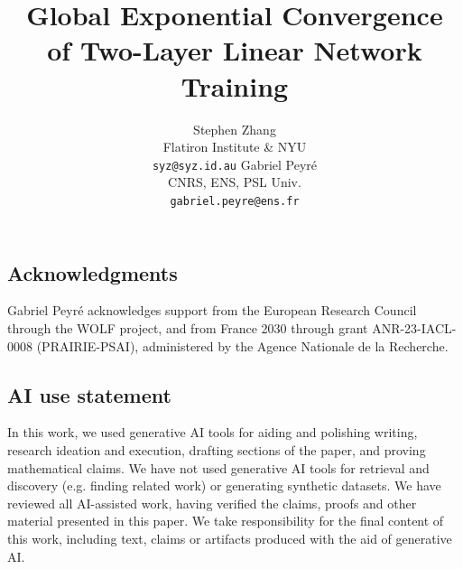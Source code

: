\documentclass{article} %
\title{Global Exponential Convergence\\of Two-Layer Linear Network Training}
\author{Stephen Zhang \\
Flatiron Institute \& NYU \\
\texttt{syz@syz.id.au}
\And
Gabriel Peyr\'e \\
CNRS, ENS, PSL Univ. \\
\texttt{gabriel.peyre@ens.fr}}
\begin{document}
\maketitle

\begin{abstract}

\end{abstract}








\FloatBarrier


\subsection*{Acknowledgments}
Gabriel Peyr\'e acknowledges support from the European Research Council through
the WOLF project, and from France 2030 through grant ANR-23-IACL-0008
(PRAIRIE-PSAI), administered by the Agence Nationale de la Recherche.

\subsection*{AI use statement}

In this work, we used generative AI tools for aiding and polishing writing, research ideation and execution, drafting sections of the paper, and proving mathematical claims.
We have not used generative AI tools for retrieval and discovery (e.g. finding related work) or generating synthetic datasets.
We have reviewed all AI-assisted work, having verified the claims, proofs and other material presented in this paper.
We take responsibility for the final content of this work, including text, claims or artifacts produced with the aid of generative AI.



\appendix





\clearpage

\clearpage

\end{document}
